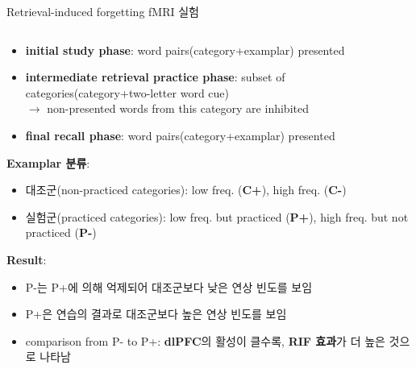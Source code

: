 \documentclass{beamer}
\begin{document}
\begin{frame}{Retrieval-induced forgetting fMRI 실험}
\begin{columns}
\begin{column}{0.6\textwidth}
      \begin{itemize}
        \setlength{\itemsep}{0em}
        \setlength{\parskip}{0em}
        \small
        \item \textbf{initial study phase}: word pairs(category+examplar) presented
        \item \textbf{intermediate retrieval practice phase}: subset of categories(category+two-letter word cue)\\
        $\longrightarrow$ non-presented words from this category are inhibited
        \item \textbf{final recall phase}: word pairs(category+examplar) presented
      \end{itemize}
      \vspace{0.5em}
      \textbf{Examplar 분류}:
      \vspace{-0.5em}
      \begin{itemize}
        \setlength{\itemsep}{0em}
        \setlength{\parskip}{0em}
        \small
        \item 대조군(non-practiced categories): low freq. (\textbf{C+}), high freq. (\textbf{C-})
        \item 실험군(practiced categories): low freq. but practiced (\textbf{P+}), high freq. but not practiced (\textbf{P-})
      \end{itemize}
      \vspace{0.5em}
      \textbf{Result}:
      \vspace{-0.5em}
      \begin{itemize}
        \setlength{\itemsep}{0em}
        \setlength{\parskip}{0em}
        \small
        \item P-는 P+에 의해 억제되어 대조군보다 낮은 연상 빈도를 보임
        \item P+은 연습의 결과로 대조군보다 높은 연상 빈도를 보임
        \item comparison from P- to P+: \textbf{dlPFC}의 활성이 클수록, \textbf{RIF 효과}가 더 높은 것으로 나타남
      \end{itemize}


    \end{column}
  \end{columns}
\end{frame}
\end{document}
